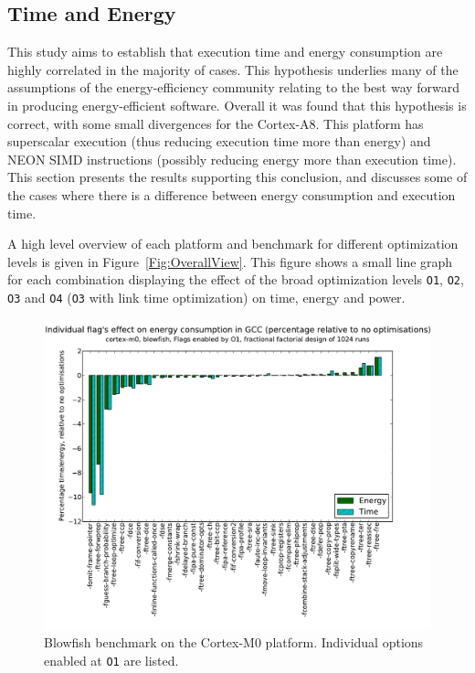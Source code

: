 \documentclass[twocolumn]{article}
\let\oldcaption\caption
\renewcommand{\caption}[1]{\oldcaption{\textup{#1}}}
\begin{document}
\subsection*{Time and Energy}

This study aims to establish that execution time and energy consumption are highly correlated in the majority of cases. This hypothesis underlies many of the assumptions of the energy-efficiency community relating to the best way forward in producing energy-efficient software. Overall it was found that this hypothesis is correct, with some small divergences for the Cortex-A8. This platform has superscalar execution (thus reducing execution time more than energy) and NEON SIMD instructions (possibly reducing energy more than execution time). This section presents the results supporting this conclusion, and discusses some of the cases where there is a difference between energy consumption and execution time.

A high level overview of each platform and benchmark for different optimization levels is given in Figure~\ref{Fig:OverallView}. This figure shows a small line graph for each combination displaying the effect of the broad optimization levels \texttt{O1}, \texttt{O2}, \texttt{O3} and \texttt{O4} (\texttt{O3} with link time optimization) on time, energy and power.

\begin{figure}[t]
	\includegraphics[width=\linewidth,clip,trim=0.5cm 0 2cm 1.8cm]{cortex-m0/O1_main_effects_blowfish.pdf}
	\caption{Blowfish benchmark on the Cortex-M0 platform. Individual options enabled at \texttt{O1} are listed.}
	\label{Fig:BlowfishMainEffects}
\end{figure}
\end{document}
